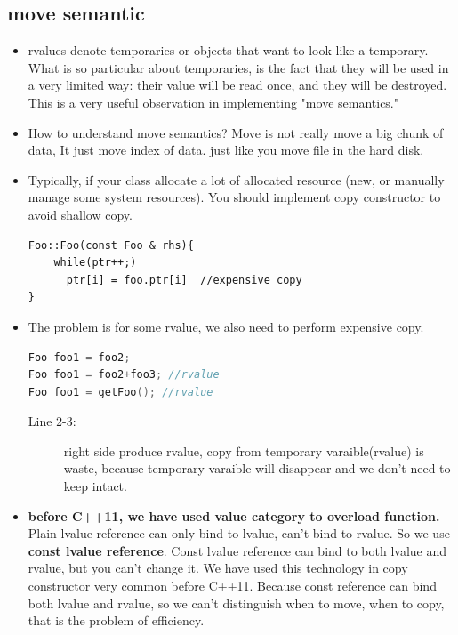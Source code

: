 \documentclass[a4paper,11pt,twoside]{book}
\begin{document}
\subsection{ move semantic}
\begin{itemize}
	
	\item rvalues denote temporaries or objects that want to look like a temporary. What is so particular about temporaries, is the fact that they will be used in a very limited way: their value will be read once, and they will be destroyed. This is a very useful observation in implementing "move semantics." 
	
	\item How to understand move semantics? Move is not really move a big chunk of data, It just move index of data. just like you move file in the hard disk. 
	
	
	\item Typically, if your class allocate a lot of allocated resource (new, or manually manage some system resources).  You should implement copy constructor to avoid shallow copy. 
\begin{lstlisting}[numbers=none]
Foo::Foo(const Foo & rhs){
	while(ptr++;)
	  ptr[i] = foo.ptr[i]  //expensive copy
}
\end{lstlisting}

	\item The problem is for some rvalue, we also need to perform expensive copy. 
\begin{lstlisting}[frame=single, language=c++]
Foo foo1 = foo2;
Foo foo1 = foo2+foo3; //rvalue
Foo foo1 = getFoo(); //rvalue
\end{lstlisting}

\begin{description}
	\item[Line 2-3:] right side produce rvalue, copy from temporary varaible(rvalue) is waste, because temporary varaible will disappear and we don't need to keep intact. 
\end{description}

	\item \textbf{before C++11, we have used value category to overload function.} Plain lvalue reference can only bind to lvalue, can't bind to rvalue. So we use \textbf{const lvalue reference}.  Const lvalue reference can bind to both lvalue and rvalue, but you can't change it. We have used this technology in copy constructor very common before C++11. Because const reference can bind both lvalue and rvalue, so we can't distinguish when to move, when to copy, that is the problem of efficiency.


\end{itemize}
\end{document}
